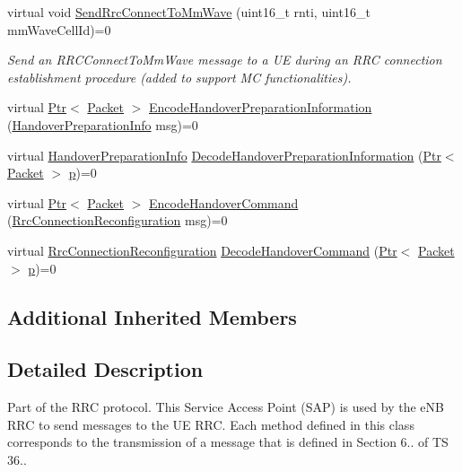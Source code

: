 \begin{DoxyCompactItemize}
virtual void \hyperlink{classns3_1_1LteEnbRrcSapUser_aee87f06442e7688b7d81fab229857ed4}{Send\+Rrc\+Connect\+To\+Mm\+Wave} (uint16\+\_\+t rnti, uint16\+\_\+t mm\+Wave\+Cell\+Id)=0
\begin{DoxyCompactList}\small\item\em Send an {\itshape R\+R\+C\+Connect\+To\+Mm\+Wave} message to a UE during an R\+RC connection establishment procedure (added to support MC functionalities). \end{DoxyCompactList}\item 
virtual \hyperlink{classns3_1_1Ptr}{Ptr}$<$ \hyperlink{classns3_1_1Packet}{Packet} $>$ \hyperlink{classns3_1_1LteEnbRrcSapUser_ae3458e66a25e5f3494822bc88f1c5685}{Encode\+Handover\+Preparation\+Information} (\hyperlink{structns3_1_1LteRrcSap_1_1HandoverPreparationInfo}{Handover\+Preparation\+Info} msg)=0
\item 
virtual \hyperlink{structns3_1_1LteRrcSap_1_1HandoverPreparationInfo}{Handover\+Preparation\+Info} \hyperlink{classns3_1_1LteEnbRrcSapUser_a862d5078b7b5f6cb58a8a9f526ac059a}{Decode\+Handover\+Preparation\+Information} (\hyperlink{classns3_1_1Ptr}{Ptr}$<$ \hyperlink{classns3_1_1Packet}{Packet} $>$ \hyperlink{lte__link__budget__x2__handover__measures_8m_ac9de518908a968428863f829398a4e62}{p})=0
\item 
virtual \hyperlink{classns3_1_1Ptr}{Ptr}$<$ \hyperlink{classns3_1_1Packet}{Packet} $>$ \hyperlink{classns3_1_1LteEnbRrcSapUser_a3df7c56ab7b01b04c5745a117a9bc13a}{Encode\+Handover\+Command} (\hyperlink{structns3_1_1LteRrcSap_1_1RrcConnectionReconfiguration}{Rrc\+Connection\+Reconfiguration} msg)=0
\item 
virtual \hyperlink{structns3_1_1LteRrcSap_1_1RrcConnectionReconfiguration}{Rrc\+Connection\+Reconfiguration} \hyperlink{classns3_1_1LteEnbRrcSapUser_a620e99f7ab0ac1b0566bc25d7908db38}{Decode\+Handover\+Command} (\hyperlink{classns3_1_1Ptr}{Ptr}$<$ \hyperlink{classns3_1_1Packet}{Packet} $>$ \hyperlink{lte__link__budget__x2__handover__measures_8m_ac9de518908a968428863f829398a4e62}{p})=0
\end{DoxyCompactItemize}
\subsection*{Additional Inherited Members}


\subsection{Detailed Description}
Part of the R\+RC protocol. This Service Access Point (S\+AP) is used by the e\+NB R\+RC to send messages to the UE R\+RC. Each method defined in this class corresponds to the transmission of a message that is defined in Section 6.. of TS 36.. 

